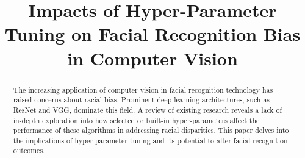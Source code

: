 \documentclass[conference]{IEEEtran}
\begin{document}
\title{Impacts of Hyper-Parameter Tuning on Facial Recognition Bias in Computer Vision\\
}

\author{
\and
{}
\and
{}
\and
{}
}

\maketitle

\begin{abstract}
The increasing application of computer vision in facial recognition technology has raised concerns about racial bias. Prominent deep learning architectures, such as ResNet and VGG, dominate this field. A review of existing research reveals a lack of in-depth exploration into how selected or built-in hyper-parameters affect the performance of these algorithms in addressing racial disparities. This paper delves into the implications of hyper-parameter tuning and its potential to alter facial recognition outcomes.
\end{abstract}
\end{document}
